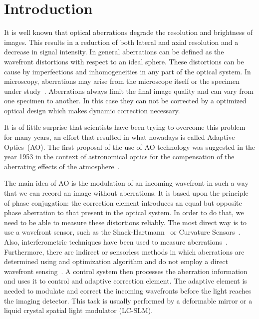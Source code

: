 \section{Introduction}
\label{sec:Introduction}

It is well known that optical aberrations degrade the resolution and brightness of images. This results in a reduction of both lateral and axial resolution and a decrease in signal intensity. In general aberrations can be defined as the wavefront distortions with respect to an ideal sphere. These distortions can be cause by imperfections and inhomogeneities in any part of the optical system. In microscopy, aberrations may arise from the microscope itself or the specimen under study~\cite{AOM_basic_ref}. Aberrations always limit the final image quality and can vary from one specimen to another. In this case they can not be corrected by a optimized optical design which makes dynamic correction necessary. 
 
It is of little surprise that scientists have been trying to overcome this problem for many years, an effort that resulted in what nowadays is called Adaptive Optics~(AO).
The first proposal of the use of AO technology was suggested in the year 1953 in the context of astronomical optics for the compensation of the aberrating effects of the atmosphere~\cite{Babcock1953}.

The main idea of AO is the modulation of an incoming wavefront in such a way that we can record an image without aberrations. It is based upon the principle of phase conjugation: the correction element introduces an equal but opposite phase aberration to that present in the optical system. In order to do that, we need to be able to measure these distortions reliably. The most direct way is to use a wavefront sensor, such as the Shack-Hartmann~\cite{Principles_HS, History_HS} or Curvature Sensors~\cite{Curvature_Sensor_1st_Paper}. Also, interferometric techniques have been used to measure aberrations~\cite{Interferometric_methods}. Furthermore, there are indirect or sensorless methods in which aberrations are determined using and optimization algorithm and do not employ a direct  wavefront sensing~\cite{WF_sensorless}. A control system then  processes the aberration information and uses it to control and adaptive correction element. The adaptive element is needed to modulate and correct the incoming wavefronts before the light reaches the imaging detector.  This task is usually performed by a deformable mirror or a liquid crystal spatial light modulator (LC-SLM). 

